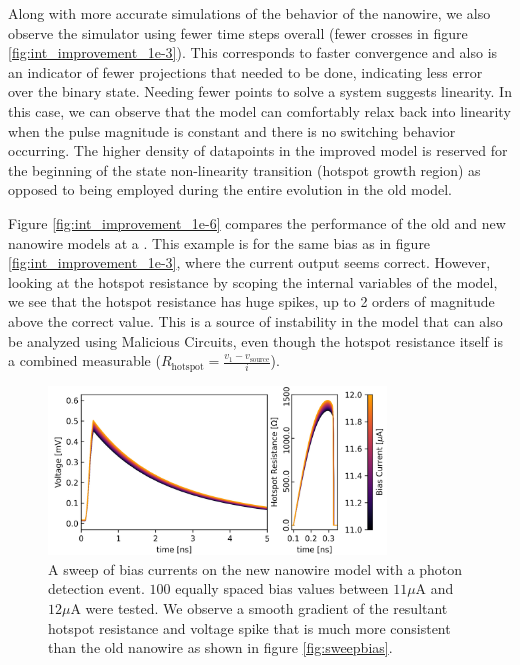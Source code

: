 Along with more accurate simulations of the behavior of the nanowire, we also
observe the simulator using fewer time steps overall (fewer crosses in figure 
\ref{fig:int_improvement_1e-3}). This corresponds to faster convergence and also is
an indicator of fewer projections that needed to be done, indicating less
error over the binary state. Needing fewer points to solve a system suggests
linearity. In this case, we can observe that the model can comfortably relax
back into linearity when the pulse magnitude is constant and there is no
switching behavior occurring. The higher density of datapoints in the improved model 
is reserved for the beginning of the state non-linearity transition (hotspot growth region)
as opposed to being employed during the entire evolution in the old model.

Figure \ref{fig:int_improvement_1e-6} compares the performance of the old and new 
nanowire models at a . This example is for the same bias as in 
figure \ref{fig:int_improvement_1e-3}, where the current output seems correct.
However, looking at the hotspot resistance by scoping the internal variables of the 
model, we see that the hotspot resistance has huge spikes, up to 2 orders of magnitude
above the correct value. This is a source of instability in the model that can also
be analyzed using Malicious Circuits, even though the hotspot resistance itself is
a combined measurable ($R_{\mathrm{hotspot}} = \frac{v_1 - v_{\mathrm{source}}}{i}$).

\begin{figure}
    \centering
    \includegraphics[width=0.8\textwidth]{figs/not_jumbled_mess.png}
    \caption{A sweep of bias currents on the new nanowire model with a photon detection event.
    $100$ equally spaced bias values between $11\mu$A and $12\mu$A were tested. We observe
    a smooth gradient of the resultant
    hotspot resistance and voltage spike that is much more consistent than the old nanowire
    as shown in figure \ref{fig:sweepbias}. 
    }
    \label{fig:not_jumbled_mess}
\end{figure}

